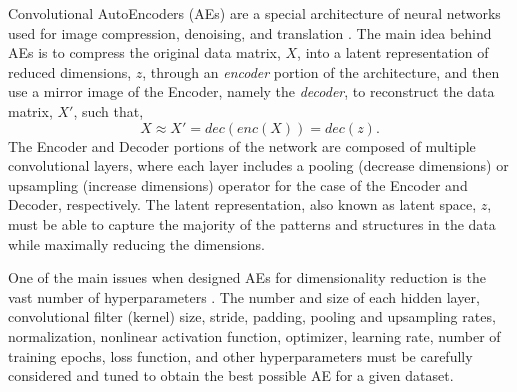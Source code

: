 \documentclass[a4paper,fleqn,12pt]{article}
\begin{document}
Convolutional AutoEncoders (AEs) are a special architecture of neural networks used for image compression, denoising, and translation \cite{jiang2021convolutional, liu2017unsupervised}. The main idea behind AEs is to compress the original data matrix, $X$, into a latent representation of reduced dimensions, $z$, through an \emph{encoder} portion of the architecture, and then use a mirror image of the Encoder, namely the \emph{decoder}, to reconstruct the data matrix, $X'$, such that,
\begin{equation}
    X \approx X' = dec(enc(X)) = dec(z) .
\end{equation}
The Encoder and Decoder portions of the network are composed of multiple convolutional layers, where each layer includes a pooling (decrease dimensions) or upsampling (increase dimensions) operator for the case of the Encoder and Decoder, respectively. The latent representation, also known as latent space, $z$, must be able to capture the majority of the patterns and structures in the data while maximally reducing the dimensions. 

One of the main issues when designed AEs for dimensionality reduction is the vast number of hyperparameters \cite{hutter2015beyond}. The number and size of each hidden layer, convolutional filter (kernel) size, stride, padding, pooling and upsampling rates, normalization, nonlinear activation function, optimizer, learning rate, number of training epochs, loss function, and other hyperparameters must be carefully considered and tuned to obtain the best possible AE for a given dataset. 

\end{document}
